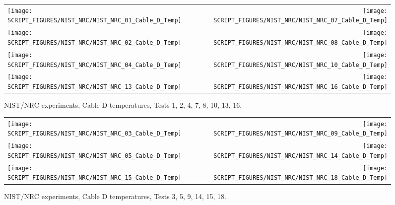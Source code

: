 \begin{figure}[p]
\begin{tabular*}{\textwidth}{l@{\extracolsep{\fill}}r}
\texttt{[image: SCRIPT\_FIGURES/NIST\_NRC/NIST\_NRC\_01\_Cable\_D\_Temp]} &
\texttt{[image: SCRIPT\_FIGURES/NIST\_NRC/NIST\_NRC\_07\_Cable\_D\_Temp]} \\
\texttt{[image: SCRIPT\_FIGURES/NIST\_NRC/NIST\_NRC\_02\_Cable\_D\_Temp]} &
\texttt{[image: SCRIPT\_FIGURES/NIST\_NRC/NIST\_NRC\_08\_Cable\_D\_Temp]} \\
\texttt{[image: SCRIPT\_FIGURES/NIST\_NRC/NIST\_NRC\_04\_Cable\_D\_Temp]} &
\texttt{[image: SCRIPT\_FIGURES/NIST\_NRC/NIST\_NRC\_10\_Cable\_D\_Temp]} \\
\texttt{[image: SCRIPT\_FIGURES/NIST\_NRC/NIST\_NRC\_13\_Cable\_D\_Temp]} &
\texttt{[image: SCRIPT\_FIGURES/NIST\_NRC/NIST\_NRC\_16\_Cable\_D\_Temp]}
\end{tabular*}
\caption{NIST/NRC experiments, Cable D temperatures, Tests 1, 2, 4, 7, 8, 10, 13, 16.}
\label{NIST_NRC_Cable_D_Closed}
\end{figure}

\begin{figure}[p]
\begin{tabular*}{\textwidth}{l@{\extracolsep{\fill}}r}
\texttt{[image: SCRIPT\_FIGURES/NIST\_NRC/NIST\_NRC\_03\_Cable\_D\_Temp]} &
\texttt{[image: SCRIPT\_FIGURES/NIST\_NRC/NIST\_NRC\_09\_Cable\_D\_Temp]} \\
\texttt{[image: SCRIPT\_FIGURES/NIST\_NRC/NIST\_NRC\_05\_Cable\_D\_Temp]} &
\texttt{[image: SCRIPT\_FIGURES/NIST\_NRC/NIST\_NRC\_14\_Cable\_D\_Temp]} \\
\texttt{[image: SCRIPT\_FIGURES/NIST\_NRC/NIST\_NRC\_15\_Cable\_D\_Temp]} &
\texttt{[image: SCRIPT\_FIGURES/NIST\_NRC/NIST\_NRC\_18\_Cable\_D\_Temp]}
\end{tabular*}
\caption{NIST/NRC experiments, Cable D temperatures, Tests 3, 5, 9, 14, 15, 18.}
\label{NIST_NRC_Cable_D_Open}
\end{figure}

